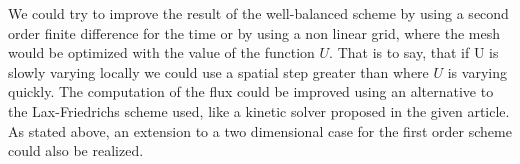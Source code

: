             We could try to improve the result of the well-balanced scheme by using a second order finite difference for the time or by using a non linear grid, where the mesh would be optimized with the value of the function $U$. That is to say, that if U is slowly varying locally  we could use a spatial step greater than where $U$ is varying quickly. The computation of the flux could be improved using an alternative to the Lax-Friedrichs scheme used, like a kinetic solver proposed in the given article. 
            As stated above, an extension to a two dimensional case for the first order scheme could also be realized.

\newpage
\nocite{*}

{}





        
